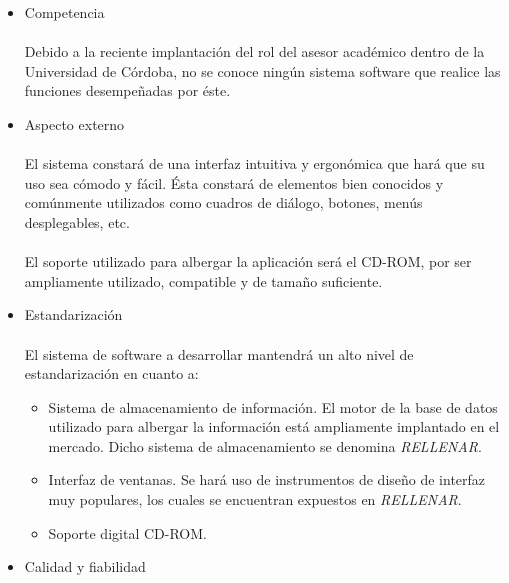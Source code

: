 \begin{itemize}
 \item Competencia

   \paragraph{}Debido a la reciente implantación del rol del asesor académico
   dentro de la Universidad de Córdoba, no se conoce ningún sistema software
   que realice las funciones desempeñadas por éste.

 \item Aspecto externo

   \paragraph{}El sistema constará de una interfaz intuitiva y ergonómica que
   hará que su uso sea cómodo y fácil. Ésta constará de elementos bien conocidos
   y comúnmente utilizados como cuadros de diálogo, botones, menús desplegables,
   etc.

   \paragraph{}El soporte utilizado para albergar la aplicación será el CD-ROM,
   por ser ampliamente utilizado, compatible y de tamaño suficiente.

 \item Estandarización

   \paragraph{}El sistema de software a desarrollar mantendrá un alto nivel de
   estandarización en cuanto a:

   \begin{itemize}
      \item Sistema de almacenamiento de información. El motor de la base de
      datos utilizado para albergar la información está ampliamente implantado
      en el mercado. Dicho sistema de almacenamiento se denomina
      \textit{RELLENAR}.
      \item Interfaz de ventanas. Se hará uso de instrumentos de diseño de
      interfaz muy populares, los cuales se encuentran expuestos en
      \textit{RELLENAR}.
      \item Soporte digital CD-ROM.
   \end{itemize}


 \item Calidad y fiabilidad


\end{itemize}
